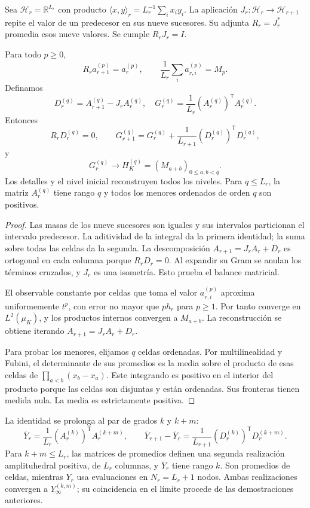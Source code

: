 Sea \(\mathcal H_r=\mathbb R^{L_r}\) con producto
\(\langle x,y\rangle_r=L_r^{-1}\sum_i x_i y_i\). La aplicación
\(J_r:\mathcal H_r\to\mathcal H_{r+1}\) repite el valor de un
predecesor en sus nueve sucesores. Su adjunta \(R_r=J_r^*\) promedia esos
nueve valores. Se cumple \(R_rJ_r=I\).

\begin{theorem}
\label{thm:dim-cell-balance}
Para todo \(p\geq0\),
\[
 R_r a_{r+1}^{(p)}=a_r^{(p)},\qquad
 \frac1{L_r}\sum_i a_{r,i}^{(p)}=M_p.
\]
Definamos
\[
 D_r^{(q)}=A_{r+1}^{(q)}-J_rA_r^{(q)},\quad
 G_r^{(q)}=\frac1{L_r}(A_r^{(q)})^{\mathsf T}A_r^{(q)}.
\]
Entonces
\[
 R_rD_r^{(q)}=0,\qquad
 G_{r+1}^{(q)}=G_r^{(q)}+
       \frac1{L_{r+1}}(D_r^{(q)})^{\mathsf T}D_r^{(q)},
\]
y
\[
 G_r^{(q)}\longrightarrow H_K^{(q)}=(M_{a+b})_{0\leq a,b<q}.
\]
Los detalles y el nivel inicial reconstruyen todos los niveles. Para
\(q\leq L_r\), la matriz \(A_r^{(q)}\) tiene rango \(q\) y
todos los menores ordenados de orden \(q\) son positivos.
\end{theorem}
\begin{proof}
Las masas de los nueve sucesores son iguales y sus intervalos particionan
el intervalo predecesor. La aditividad de la integral da la primera identidad;
la suma sobre todas las celdas da la segunda. La descomposición
\(A_{r+1}=J_rA_r+D_r\) es ortogonal en cada columna porque
\(R_rD_r=0\). Al expandir su Gram se anulan los términos cruzados,
y \(J_r\) es una isometría. Esto prueba el balance matricial.

El observable constante por celdas que toma el valor \(a_{r,i}^{(p)}\)
aproxima uniformemente \(t^p\), con error no mayor que \(p h_r\)
para \(p\geq1\). Por tanto converge en \(L^2(\mu_K)\), y los
productos internos convergen a \(M_{a+b}\). La reconstrucción se
obtiene iterando \(A_{r+1}=J_rA_r+D_r\).

Para probar los menores, elijamos \(q\) celdas ordenadas. Por
multilinealidad y Fubini, el determinante de sus promedios es la media
sobre el producto de esas celdas de
\(\prod_{a<b}(x_b-x_a)\). Este integrando es positivo en el
interior del producto porque las celdas son disjuntas y están ordenadas.
Sus fronteras tienen medida nula. La media es estrictamente positiva.
\end{proof}

La identidad se prolonga al par de grados \(k\) y \(k+m\):
\[
 \overline Y_r=\frac1{L_r}(A_r^{(k)})^{\mathsf T}A_r^{(k+m)},
 \qquad
 \overline Y_{r+1}-\overline Y_r
 =\frac1{L_{r+1}}(D_r^{(k)})^{\mathsf T}D_r^{(k+m)}.
\]
Para \(k+m\leq L_r\), las matrices de promedios definen una
segunda realización amplituhedral positiva, de \(L_r\) columnas,
y \(\overline Y_r\) tiene rango \(k\). Son promedios de celdas,
mientras \(Y_r\) usa evaluaciones en \(N_r=L_r+1\) nodos. Ambas
realizaciones convergen a \(Y_\infty^{(k,m)}\); su coincidencia
en el límite procede de las demostraciones anteriores.


